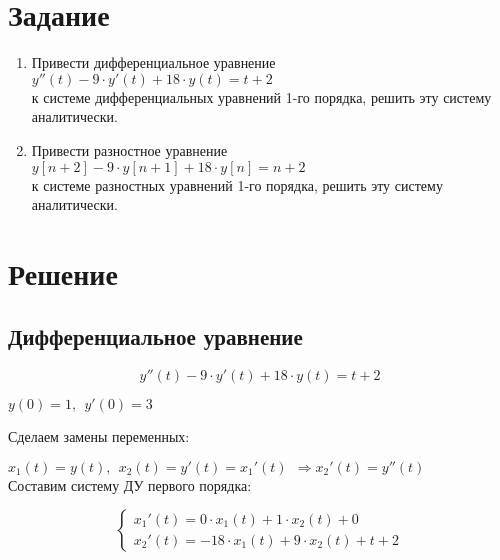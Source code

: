 




\section{Задание}

\begin{enumerate}

\item Привести дифференциальное уравнение\\ $y''(t) - 9 \cdot y'(t) + 18 \cdot y(t) = t + 2$\\ к системе дифференциальных уравнений 1-го порядка, решить эту систему аналитически.

\item Привести разностное уравнение\\ $y[n+2] - 9 \cdot y[n+1] + 18 \cdot y[n] = n + 2$\\ к системе разностных уравнений 1-го порядка, решить эту систему аналитически.

\end{enumerate}

\section{Решение}

\subsection{Дифференциальное уравнение}

\begin{displaymath}
y''(t) - 9 \cdot y'(t) + 18 \cdot y(t) = t + 2
\end{displaymath}
\begin{center}
$y(0) = 1,\ \ y'(0) = 3$
\end{center}

Сделаем замены переменных:

$x_1(t) = y(t),\ \ x_2(t) = y'(t) = x_1'(t) \ \ \Rightarrow x_2'(t) = y''(t)$\\[1mm]

Составим систему ДУ первого порядка:

\begin{displaymath}
\begin{cases}
x_1'(t) = 0 \cdot x_1(t) + 1 \cdot x_2(t) + 0
\\
x_2'(t) = - 18 \cdot x_1(t) + 9 \cdot x_2(t) + t + 2
\end{cases}
\end{displaymath}

